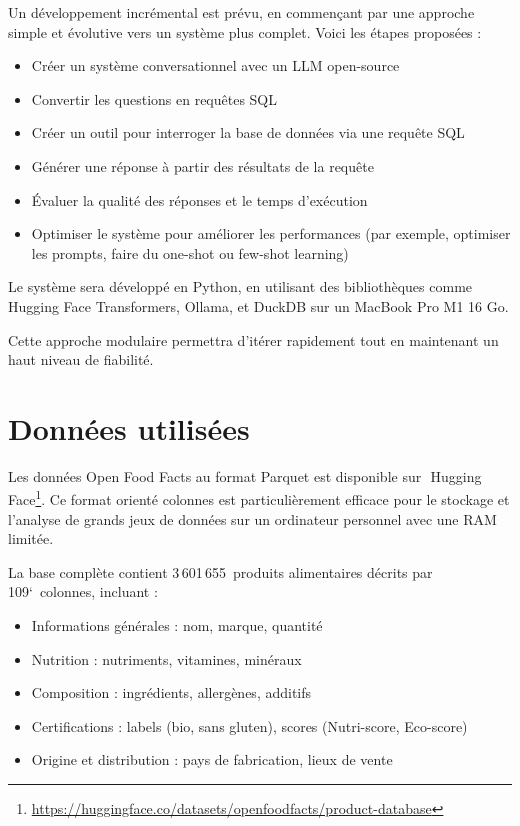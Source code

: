 \documentclass[a4paper,11pt]{article}
\begin{document}
Un développement incrémental est prévu, en commençant par une approche simple et évolutive vers un système plus complet.
Voici les étapes proposées :

\begin{itemize}
    \item Créer un système conversationnel avec un LLM open-source 
    \item Convertir les questions en requêtes SQL
    \item Créer un outil pour interroger la base de données via une requête SQL
    \item Générer une réponse à partir des résultats de la requête
    \item Évaluer la qualité des réponses et le temps d'exécution
    \item Optimiser le système pour améliorer les performances (par exemple, optimiser les prompts, faire du one-shot ou few-shot learning)
\end{itemize}

Le système sera développé en Python, en utilisant des bibliothèques comme Hugging Face Transformers, Ollama, et DuckDB sur un MacBook Pro M1 16 Go.

Cette approche modulaire permettra d'itérer rapidement tout en maintenant un haut niveau de fiabilité. 


\section{Données utilisées}
\label{sec:donnees}

Les données Open Food Facts au format Parquet est disponible sur~\,Hugging 
Face\footnote{\url{https://huggingface.co/datasets/openfoodfacts/product-database}}. 
Ce format orienté colonnes est particulièrement efficace pour le stockage et l'analyse de grands jeux de données sur un ordinateur personnel avec une RAM limitée.

La base complète contient 3\,601\,655~produits alimentaires décrits par 109`~colonnes, incluant :

\begin{itemize}
    \item Informations générales : nom, marque, quantité
    \item Nutrition : nutriments, vitamines, minéraux
    \item Composition : ingrédients, allergènes, additifs
    \item Certifications : labels (bio, sans gluten), scores (Nutri-score, Eco-score)
    \item Origine et distribution : pays de fabrication, lieux de vente
\end{itemize}
\end{document}

